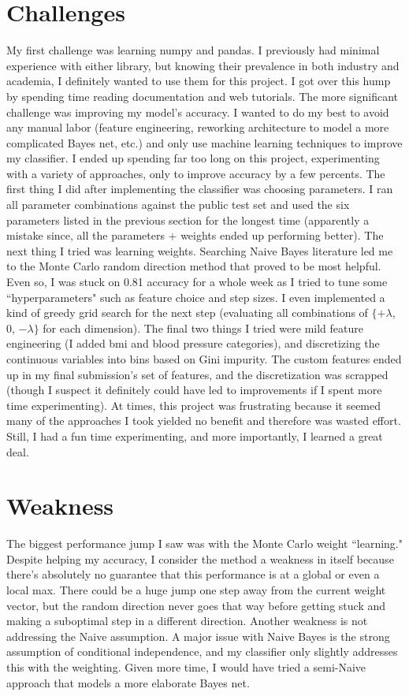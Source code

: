 \documentclass{article}
\begin{document}
\section{Challenges}
My first challenge was learning numpy and pandas. I previously had minimal experience with either library, but knowing their prevalence in both industry and academia, I definitely wanted to use them for this project. I got over this hump by spending time reading documentation and web tutorials. The more significant challenge was improving my model's accuracy. I wanted to do my best to avoid any manual labor (feature engineering, reworking architecture to model a more complicated Bayes net, etc.) and only use machine learning techniques to improve my classifier. I ended up spending far too long on this project, experimenting with a variety of approaches, only to improve accuracy by a few percents. The first thing I did after implementing the classifier was choosing parameters. I ran all parameter combinations against the public test set and used the six parameters listed in the previous section for the longest time (apparently a mistake since, all the parameters + weights ended up performing better). The next thing I tried was learning weights. Searching Naive Bayes literature led me to the Monte Carlo random direction method that proved to be most helpful. Even so, I was stuck on 0.81 accuracy for a whole week as I tried to tune some ``hyperparameters" such as feature choice and step sizes. I even implemented a kind of greedy grid search for the next step (evaluating all combinations of $\{+\lambda$, 0, $-\lambda\}$ for each dimension). The final two things I tried were mild feature engineering (I added bmi and blood pressure categories), and discretizing the continuous variables into bins based on Gini impurity. The custom features ended up in my final submission's set of features, and the discretization was scrapped (though I suspect it definitely could have led to improvements if I spent more time experimenting). At times, this project was frustrating because it seemed many of the approaches I took yielded no benefit and therefore was wasted effort. Still, I had a fun time experimenting, and more importantly, I learned a great deal.

\section{Weakness}
The biggest performance jump I saw was with the Monte Carlo weight ``learning." Despite helping my accuracy, I consider the method a weakness in itself because there's absolutely no guarantee that this performance is at a global or even a local max. There could be a huge jump one step away from the current weight vector, but the random direction never goes that way before getting stuck and making a suboptimal step in a different direction. Another weakness is not addressing the Naive assumption. A major issue with Naive Bayes is the strong assumption of conditional independence, and my classifier only slightly addresses this with the weighting. Given more time, I would have tried a semi-Naive approach that models a more elaborate Bayes net.
\end{document}
